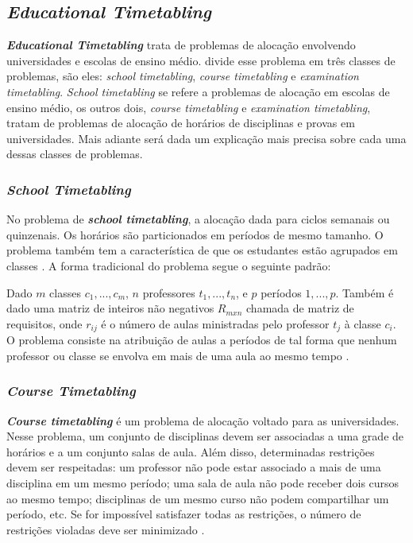 \subsection{\textit{Educational Timetabling}}

\textbf{\textit{Educational Timetabling}} trata de problemas de alocação envolvendo universidades e escolas de ensino médio.  divide esse problema em três classes de problemas, são eles: \textit{school timetabling}, \textit{course timetabling} e \textit{examination timetabling}. \textit{School timetabling} se refere a problemas de alocação em escolas de ensino médio, os outros dois, \textit{course timetabling} e \textit{examination timetabling}, tratam de problemas de alocação de horários de disciplinas e provas em universidades. Mais adiante será dada um explicação mais precisa sobre cada uma dessas classes de problemas.

\subsubsection{\textit{School Timetabling}}

No problema de \textbf{\textit{school timetabling}}, a alocação dada para ciclos semanais ou quinzenais. Os horários são particionados em períodos de mesmo tamanho. O problema também tem a característica de que os estudantes estão agrupados em classes \cite{kingston2004tiling}. A forma tradicional do problema segue o seguinte padrão:

Dado $m$ classes $c_1, ..., c_m$, $n$ professores $t_1, ..., t_n$, e $p$ períodos $1, ..., p$. Também é dado uma matriz de inteiros não negativos $R_{mxn}$ chamada de matriz de requisitos, onde $r_{ij}$ é o número de aulas ministradas pelo professor $t_j$ à classe $c_i$.
O problema consiste na atribuição de aulas a períodos de tal forma que nenhum professor ou classe se envolva em mais de uma aula ao mesmo tempo \cite{vslechta2004decomposition}. 

\subsubsection{\textit{Course Timetabling}}

\textbf{\textit{Course timetabling}} é um problema de alocação voltado para as universidades. Nesse problema, um conjunto de disciplinas devem ser associadas a uma grade de horários e a um conjunto salas de aula. Além disso, determinadas restrições devem ser respeitadas: um professor não pode estar associado a mais de uma disciplina em um mesmo período; uma sala de aula não pode receber dois cursos ao mesmo tempo; disciplinas de um mesmo curso não podem compartilhar um período, etc. Se for impossível satisfazer todas as restrições, o número de restrições violadas deve ser minimizado \cite{lach2012curriculum}.

